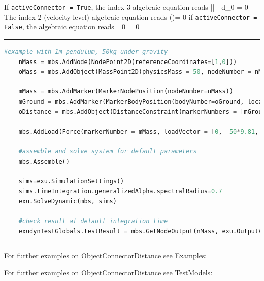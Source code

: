     If \texttt{activeConnector = True}, the index 3 algebraic equation reads
    \be
      \left|\right| - d_0 = 0
    \ee
    The index 2 (velocity level) algebraic equation reads
    \be
      \left(\right)\tp \Delta\vv = 0
    \ee
    if \texttt{activeConnector = False}, the algebraic equation reads
    \be
      \lambda_0 = 0
    \ee
\vspace{6pt}\par\noindent\rule{\textwidth}{0.4pt}
\label{miniExample_ObjectConnectorDistance}
\pythonstyle
\begin{lstlisting}[language=Python, firstnumber=1]
    #example with 1m pendulum, 50kg under gravity
    nMass = mbs.AddNode(NodePoint2D(referenceCoordinates=[1,0]))
    oMass = mbs.AddObject(MassPoint2D(physicsMass = 50, nodeNumber = nMass))
    
    mMass = mbs.AddMarker(MarkerNodePosition(nodeNumber=nMass))
    mGround = mbs.AddMarker(MarkerBodyPosition(bodyNumber=oGround, localPosition = [0,0,0]))
    oDistance = mbs.AddObject(DistanceConstraint(markerNumbers = [mGround, mMass], distance = 1))
    
    mbs.AddLoad(Force(markerNumber = mMass, loadVector = [0, -50*9.81, 0])) 

    #assemble and solve system for default parameters
    mbs.Assemble()
    
    sims=exu.SimulationSettings()
    sims.timeIntegration.generalizedAlpha.spectralRadius=0.7
    exu.SolveDynamic(mbs, sims)

    #check result at default integration time
    exudynTestGlobals.testResult = mbs.GetNodeOutput(nMass, exu.OutputVariableType.Position)[0]

\end{lstlisting}

\vspace{6pt}\par\noindent\rule{\textwidth}{0.4pt}
%
\noindent For further examples on ObjectConnectorDistance see Examples:
\bi
\item{}\ei

%
%
\noindent For further examples on ObjectConnectorDistance see TestModels:
\bi
\item{}\item{}\item{}\ei

